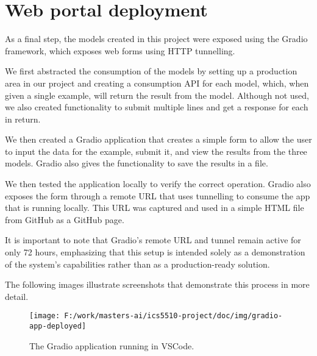 \section{Web portal deployment}

As a final step, the models created in this project were exposed using the Gradio framework, which exposes web forms using HTTP tunnelling.

We first abstracted the consumption of the models by setting up a production area in our project and creating a consumption API for each model, which, when given a single example, will return the result from the model. Although not used, we also created functionality to submit multiple lines and get a response for each in return.

We then created a Gradio application that creates a simple form to allow the user to input the data for the example, submit it, and view the results from the three models. Gradio also gives the functionality to save the results in a file.

We then tested the application locally to verify the correct operation. Gradio also exposes the form through a remote URL that uses tunnelling to consume the app that is running locally. This URL was captured and used in a simple HTML file from GitHub as a GitHub page.

It is important to note that Gradio’s remote URL and tunnel remain active for only 72 hours, emphasizing that this setup is intended solely as a demonstration of the system’s capabilities rather than as a production-ready solution.

The following images illustrate screenshots that demonstrate this process in more detail.

\begin{figure}
	\centering
	\texttt{[image: F:/work/masters-ai/ics5510-project/doc/img/gradio-app-deployed]}
	\caption{The Gradio application running in VSCode.}
	\label{fig:gradio-app-deployed}
\end{figure}
